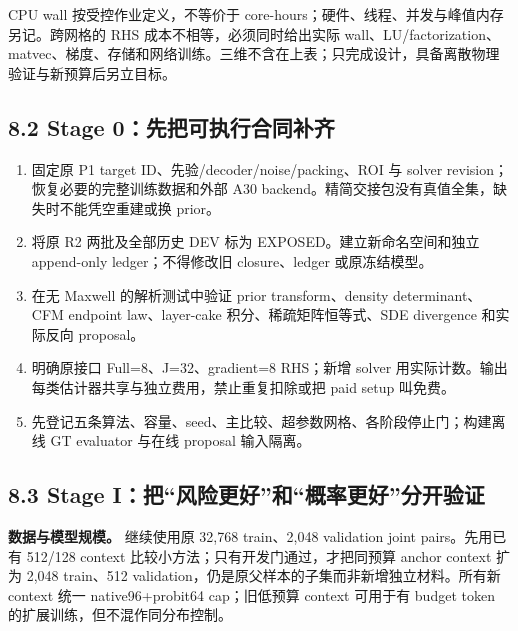 \documentclass[
  11pt,
  a4paper,
]{article}
\providecommand{\tightlist}{%
  \setlength{\itemsep}{0pt}\setlength{\parskip}{0pt}}
\begin{document}
CPU wall 按受控作业定义，不等价于
core-hours；硬件、线程、并发与峰值内存另记。跨网格的 RHS
成本不相等，必须同时给出实际
wall、LU/factorization、matvec、梯度、存储和网络训练。三维不含在上表；只完成设计，具备离散物理验证与新预算后另立目标。

\hypertarget{stage-0ux5148ux628aux53efux6267ux884cux5408ux540cux8865ux9f50}{%
\subsection{8.2 Stage
0：先把可执行合同补齐}\label{stage-0ux5148ux628aux53efux6267ux884cux5408ux540cux8865ux9f50}}

\begin{enumerate}
\def\labelenumi{\arabic{enumi}.}
\tightlist
\item
  固定原 P1 target ID、先验/decoder/noise/packing、ROI 与 solver
  revision；恢复必要的完整训练数据和外部 A30
  backend。精简交接包没有真值全集，缺失时不能凭空重建或换 prior。
\item
  将原 R2 两批及全部历史 DEV 标为 EXPOSED。建立新命名空间和独立
  append-only ledger；不得修改旧 closure、ledger 或原冻结模型。
\item
  在无 Maxwell 的解析测试中验证 prior transform、density
  determinant、CFM endpoint law、layer-cake 积分、稀疏矩阵恒等式、SDE
  divergence 和实际反向 proposal。
\item
  明确原接口 Full=8、J=32、gradient=8 RHS；新增 solver
  用实际计数。输出每类估计器共享与独立费用，禁止重复扣除或把 paid setup
  叫免费。
\item
  先登记五条算法、容量、seed、主比较、超参数网格、各阶段停止门；构建离线
  GT evaluator 与在线 proposal 输入隔离。
\end{enumerate}

\hypertarget{stage-iux628aux98ceux9669ux66f4ux597dux548cux6982ux7387ux66f4ux597dux5206ux5f00ux9a8cux8bc1}{%
\subsection{8.3 Stage
I：把``风险更好''和``概率更好''分开验证}\label{stage-iux628aux98ceux9669ux66f4ux597dux548cux6982ux7387ux66f4ux597dux5206ux5f00ux9a8cux8bc1}}

\textbf{数据与模型规模。} 继续使用原 32,768 train、2,048 validation
joint pairs。先用已有 512/128 context
比较小方法；只有开发门通过，才把同预算 anchor context 扩为 2,048
train、512 validation，仍是原父样本的子集而非新增独立材料。所有新
context 统一 native96+probit64 cap；旧低预算 context 可用于有 budget
token 的扩展训练，但不混作同分布控制。
\end{document}
